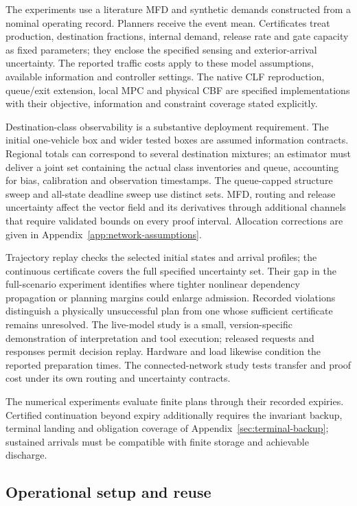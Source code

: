 \documentclass[journal,10pt]{IEEEtran}
\newcommand{\appref}[1]{Appendix~\ref{#1}}
\begin{document}
The experiments use a literature MFD and synthetic demands constructed from
a nominal operating record. Planners receive the event mean. Certificates
treat production, destination fractions, internal demand, release rate and
gate capacity as fixed parameters; they enclose the specified sensing and
exterior-arrival uncertainty. The reported traffic costs apply to these model assumptions, available
information and controller settings. The native CLF reproduction, queue/exit
extension, local MPC and physical CBF are specified implementations with
their objective, information and constraint coverage stated explicitly.

Destination-class observability is a substantive deployment requirement.
The initial one-vehicle box and wider tested boxes are assumed information
contracts. Regional totals can correspond to several destination mixtures;
an estimator must deliver a joint set containing the actual class inventories
and queue, accounting for bias, calibration and observation timestamps.
The queue-capped structure sweep and all-state deadline sweep use distinct
sets. MFD, routing and release uncertainty affect the vector field and its
derivatives through additional channels that require validated bounds on
every proof interval. Allocation corrections are given in
\appref{app:network-assumptions}.

Trajectory replay checks the selected initial states and arrival profiles;
the continuous certificate covers the full specified uncertainty set. Their gap in the full-scenario experiment identifies where tighter
nonlinear dependency propagation or planning margins could enlarge admission.
Recorded violations distinguish a physically unsuccessful plan from one
whose sufficient certificate remains unresolved. The live-model study is a
small, version-specific demonstration of interpretation and tool execution;
released requests and responses permit decision replay. Hardware and load
likewise condition the reported preparation times. The connected-network
study tests transfer and proof cost under its own routing and uncertainty
contracts.

The numerical experiments evaluate finite plans through their recorded
expiries. Certified continuation beyond expiry additionally requires the
invariant backup, terminal landing and obligation coverage of
\appref{sec:terminal-backup}; sustained arrivals must be compatible with
finite storage and achievable discharge.

\subsection{Operational setup and reuse}
\end{document}
